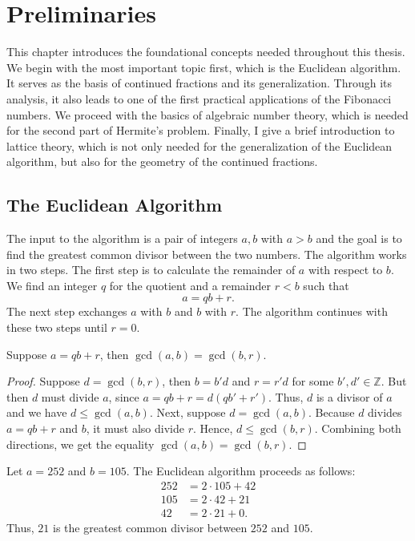 \chapter{Preliminaries}
\label{ch:preliminaries}

This chapter introduces the foundational concepts needed throughout this thesis.
We begin with the most important topic first,
which is the Euclidean algorithm.
It serves as the basis of continued fractions and its generalization.
Through its analysis, it also leads to one of the first practical applications
of the Fibonacci numbers.
We proceed with the basics of algebraic number theory,
which is needed for the second part of Hermite's problem.
Finally, I give a brief introduction to lattice theory,
which is not only needed for the generalization of the Euclidean algorithm,
but also for the geometry of the continued fractions.

\section{The Euclidean Algorithm}

The input to the algorithm is a pair of integers $a, b$ with $a > b$ and the
goal is to find the greatest common divisor between the two numbers. The
algorithm works in two steps.
The first step is to calculate the remainder of $a$ with respect to $b$.
We find an integer $q$ for the quotient and a remainder $r < b$ such that
\[
  a = q b + r.
\]
The next step exchanges $a$ with $b$ and $b$ with $r$.
The algorithm continues with these two steps until $r = 0$.

\begin{lemma}
  Suppose $a = qb + r$, then $\gcd(a, b) = \gcd(b, r)$.
\end{lemma}

\begin{proof}
  Suppose $d = \gcd(b, r)$, then $b = b'd$ and $r = r'd$ for some $b', d' ∈ ℤ$.
  But then $d$ must divide $a$, since $a = qb + r = d(qb' + r')$.
  Thus, $d$ is a divisor of $a$ and we have $d ≤ \gcd(a, b)$.
  Next, suppose $d = \gcd(a, b)$.
  Because $d$ divides $a = qb + r$ and $b$,
  it must also divide $r$.
  Hence, $d ≤ \gcd(b, r)$.
  Combining both directions, we get the equality $\gcd(a, b) = \gcd(b, r)$.
\end{proof}

\begin{example}
  Let $a = 252$ and $b = 105$.
  The Euclidean algorithm proceeds as follows:
  \begin{align*}
    252 & = 2 · 105 + 42 \\
    105 & = 2 · 42 + 21 \\
    42 & = 2 · 21 + 0.
  \end{align*}
  Thus, $21$ is the greatest common divisor between $252$ and $105$.
\end{example}

